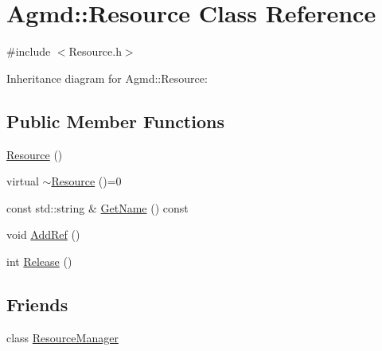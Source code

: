 \hypertarget{class_agmd_1_1_resource}{\section{Agmd\+:\+:Resource Class Reference}
\label{class_agmd_1_1_resource}
}


{\ttfamily \#include $<$Resource.\+h$>$}



Inheritance diagram for Agmd\+:\+:Resource\+:
\subsection*{Public Member Functions}
\begin{DoxyCompactItemize}
\item 
\hyperlink{class_agmd_1_1_resource_ad1a1ebf28667534167d63378f44df14c}{Resource} ()
\item 
virtual \hyperlink{class_agmd_1_1_resource_a271d2785706024b0b60d1af505531804}{$\sim$\+Resource} ()=0
\item 
const std\+::string \& \hyperlink{class_agmd_1_1_resource_a2cf166241cfc5a5f2bef049acf3be3c0}{Get\+Name} () const 
\item 
void \hyperlink{class_agmd_1_1_resource_aebaaa40478a5ccd12aca39fd05de5f03}{Add\+Ref} ()
\item 
int \hyperlink{class_agmd_1_1_resource_ae6941d1560e4f1643d7264831cc2751e}{Release} ()
\end{DoxyCompactItemize}
\subsection*{Friends}
\begin{DoxyCompactItemize}
\item 
class \hyperlink{class_agmd_1_1_resource_a54c1252abc87a78a301e6b6984470408}{Resource\+Manager}
\end{DoxyCompactItemize}


